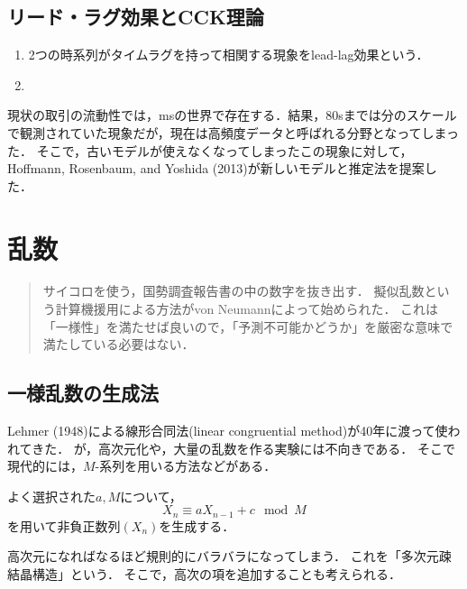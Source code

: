 \documentclass[uplatex,dvipdfmx]{jsreport}
\begin{document}
\section{リード・ラグ効果とCCK理論}

\begin{definition}\mbox{}
    \begin{enumerate}
        \item 2つの時系列がタイムラグを持って相関する現象をlead-lag効果という．
        \item 
    \end{enumerate}
\end{definition}
\begin{remarks}
    現状の取引の流動性では，msの世界で存在する．結果，80sまでは分のスケールで観測されていた現象だが，現在は高頻度データと呼ばれる分野となってしまった．
    そこで，古いモデルが使えなくなってしまったこの現象に対して，Hoffmann, Rosenbaum, and Yoshida (2013)が新しいモデルと推定法を提案した．
    
\end{remarks}

\chapter{乱数}

\begin{quotation}
    サイコロを使う，国勢調査報告書の中の数字を抜き出す．
    擬似乱数という計算機援用による方法がvon Neumannによって始められた．
    これは「一様性」を満たせば良いので，「予測不可能かどうか」を厳密な意味で満たしている必要はない．
\end{quotation}

\section{一様乱数の生成法}

\begin{tcolorbox}[colframe=ForestGreen, colback=ForestGreen!10!white,breakable,colbacktitle=ForestGreen!40!white,coltitle=black,fonttitle=\bfseries\sffamily,
title=]
    Lehmer (1948)による線形合同法(linear congruential method)が40年に渡って使われてきた．
    が，高次元化や，大量の乱数を作る実験には不向きである．
    そこで現代的には，$M$-系列を用いる方法などがある．
\end{tcolorbox}

\begin{model}
    よく選択された$a,M$について，
    \[X_n\equiv aX_{n-1}+c\mod M\]
    を用いて非負正数列$(X_n)$を生成する．
\end{model}
\begin{remarks}
    高次元になればなるほど規則的にバラバラになってしまう．
    これを「多次元疎結晶構造」という．
    そこで，高次の項を追加することも考えられる．
\end{remarks}
\end{document}
